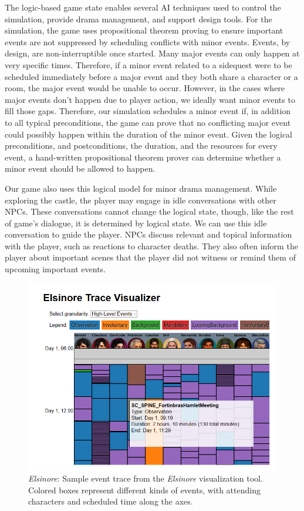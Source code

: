 \documentclass[letterpaper]{article}
\begin{document}
The logic-based game state enables several AI techniques used to control the simulation, provide drama management, and support design tools.
For the simulation, the game uses propositional theorem proving to ensure important events are not suppressed by scheduling conflicts with minor events.
Events, by design, are non-interruptible once started.
Many major events can only happen at very specific times.
Therefore, if a minor event related to a sidequest were to be scheduled immediately before a major event and they both share a character or a room, the major event would be unable to occur.
However, in the cases where major events don't happen due to player action, we ideally want minor events to fill those gaps.
Therefore, our simulation schedules a minor event if, in addition to all typical preconditions, the game can prove that no conflicting major event could possibly happen within the duration of the minor event.
Given the logical preconditions, and postconditions, the duration, and the resources for every event, a hand-written propositional theorem prover can determine whether a minor event should be allowed to happen.

Our game also uses this logical model for minor drama management.
While exploring the castle, the player may engage in idle conversations with other NPCs.
These conversations cannot change the logical state, though, like the rest of game's dialogue, it is determined by logical state.
We can use this idle conversation to guide the player.
NPCs discuss relevant and topical information with the player, such as reactions to character deaths.
They also often inform the player about important scenes that the player did not witness or remind them of upcoming important events.

\begin{figure}[tbh]
  \centering
  \includegraphics[width=\columnwidth]{images/elsinore-tool}
  \caption{\textit{Elsinore}: Sample event trace from the \textit{Elsinore} visualization tool. Colored boxes represent different kinds of events, with attending characters and scheduled time along the axes.}
  \label{fig:el-tool}
\end{figure}
\end{document}

